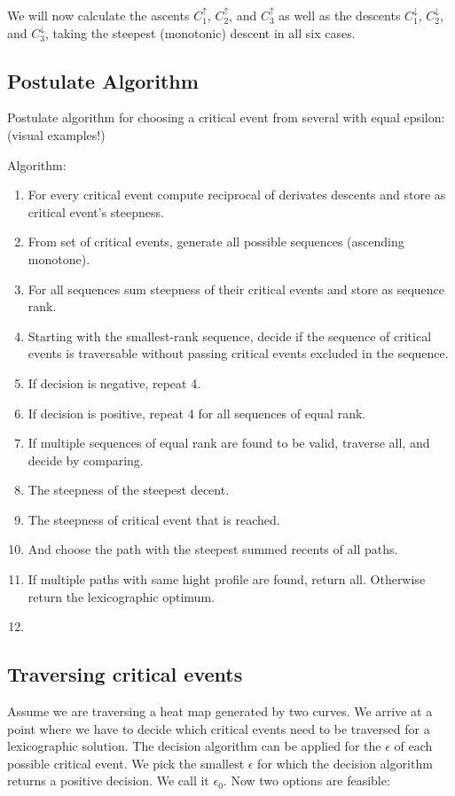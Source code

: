 We will now calculate the ascents $C_1^\uparrow$, $C_2^\uparrow$, and $C_3^\uparrow$ as well as the descents $C_1^\downarrow$, $C_2^\downarrow$, and $C_3^\downarrow$, taking the steepest (monotonic) descent in all six cases.


\subsection{Postulate Algorithm}
Postulate algorithm for choosing a critical event from several with equal epsilon: (visual examples!)

Algorithm:
\begin{enumerate}
	\item For every critical event compute reciprocal of derivates descents and store as critical event's steepness.
	\item From set of critical events, generate all possible sequences (ascending monotone).
	\item For all sequences sum steepness of their critical events and store as sequence rank.
	\item Starting with the smallest-rank sequence, decide if the sequence of critical events is traversable without passing critical events excluded in the sequence.
	\item If decision is negative, repeat 4.
	\item If decision is positive, repeat 4 for all sequences of equal rank.
	\item If multiple sequences of equal rank are found to be valid, traverse all, and decide by comparing.
	\item The steepness of the steepest decent.
	\item The steepness of critical event that is reached.
	\item And choose the path with the steepest summed recents of all paths.
	\item If multiple paths with same hight profile are found, return all. Otherwise return the lexicographic optimum.
	\item 
\end{enumerate}

\subsection{Traversing critical events}

Assume we are traversing a heat map generated by two curves. We arrive at a point where we have to decide which critical events need to be traversed for a lexicographic solution. The decision algorithm\cite{altgodau} can be applied for the $\epsilon$ of each possible critical event. We pick the smallest $\epsilon$ for which the decision algorithm returns a positive decision. We call it $\epsilon_0$. Now two options are feasible:


